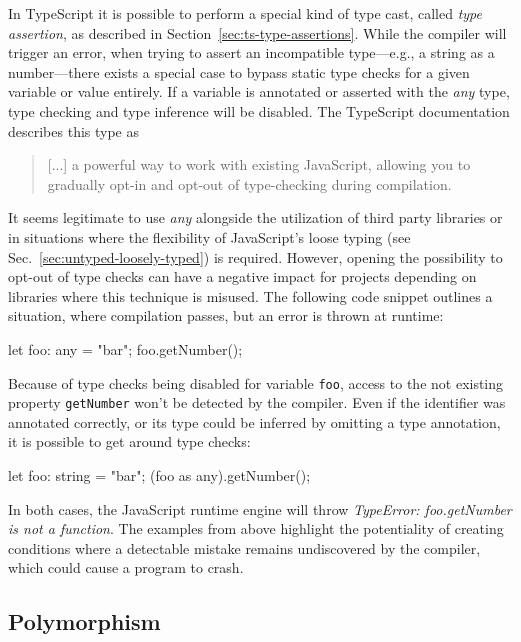 In TypeScript it is possible to perform a special kind of type cast, called \emph{type assertion}, as described in Section~\ref{sec:ts-type-assertions}. While the compiler will trigger an error, when trying to assert an incompatible type---e.g.,  a string as a number---there exists a special case to bypass static type checks for a given variable or value entirely. If a variable is annotated or asserted with the \emph{any} type, type checking and type inference will be disabled. The TypeScript documentation describes this type as 
\begin{quote}
   [...] a powerful way to work with existing JavaScript, allowing you to gradually opt-in and opt-out of type-checking during compilation.~\cite{TypeScriptHandbook:BasicTypes}
\end{quote}
It seems legitimate to use \emph{any} alongside the utilization of third party libraries or in situations where the flexibility of JavaScript's loose typing (see Sec.~\ref{sec:untyped-loosely-typed}) is required. However, opening the possibility to opt-out of type checks can have a negative impact for projects depending on libraries where this technique is misused. The following code snippet outlines a situation, where compilation passes, but an error is thrown at runtime:
\begin{JsCode}[numbers=none]
let foo: any = "bar";
foo.getNumber();
\end{JsCode}
Because of type checks being disabled for variable \texttt{foo}, access to the not existing property \texttt{getNumber} won't be detected by the compiler. Even if the identifier was annotated correctly, or its type could be inferred by omitting a type annotation, it is possible to get around type checks:
\begin{JsCode}[numbers=none]
let foo: string = "bar";
(foo as any).getNumber();
\end{JsCode}
In both cases, the JavaScript runtime engine will throw \emph{TypeError: foo.getNumber is not a function}. The examples from above highlight the potentiality of creating conditions where a detectable mistake remains undiscovered by the compiler, which could cause a program to crash.

\subsection{Polymorphism}


